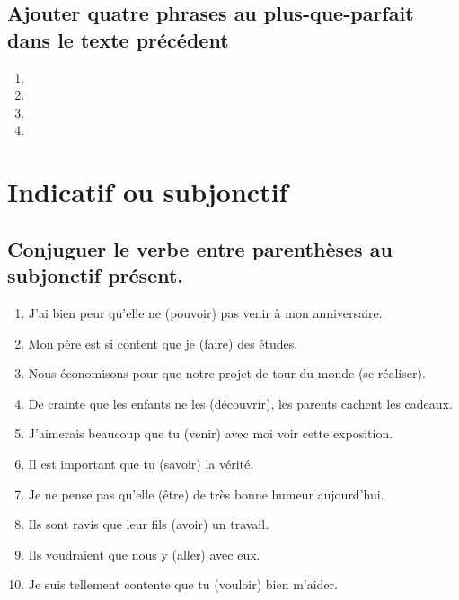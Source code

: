 \documentclass[12pt]{article}
\begin{document}
 \subsection{Ajouter quatre phrases au plus-que-parfait dans le texte précédent}
 \begin{enumerate}
	\item
	\item
	\item
	\item
 \end{enumerate}
 

 \section{Indicatif ou subjonctif}


\subsection{Conjuguer le verbe entre parenthèses au subjonctif présent.}
\begin{enumerate}
	\item J’ai bien peur qu’elle ne (pouvoir) pas venir à mon anniversaire.
	\item Mon père est si content que je (faire) des études.
	\item Nous économisons pour que notre projet de tour du monde (se réaliser).
	\item De crainte que les enfants ne les (découvrir), les parents cachent les cadeaux.
	\item J’aimerais beaucoup que tu (venir) avec moi voir cette exposition.
	\item Il est important que tu (savoir) la vérité.
	\item Je ne pense pas qu’elle (être) de très bonne humeur aujourd’hui.
	\item Ils sont ravis que leur fils (avoir) un travail.
	\item Ils voudraient que nous y (aller) avec eux.
	\item Je suis tellement contente que tu (vouloir) bien m’aider.
\end{enumerate}
\end{document}
